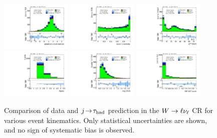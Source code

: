 \begin{figure}[!htpb]
  \includegraphics[width=0.30\textwidth]{figures/analysis/vbf-WlvCR/jets-etaprod}
  \includegraphics[width=0.30\textwidth]{figures/analysis/vbf-WlvCR/lep-eta-centrality}
  \includegraphics[width=0.30\textwidth]{figures/analysis/vbf-WlvCR/system-pt} \\
  \includegraphics[width=0.30\textwidth]{figures/analysis/vbf-WlvCR/n-jets30}
  \includegraphics[width=0.30\textwidth]{figures/analysis/vbf-WlvCR/dijet-m-veryhigh}
  \includegraphics[width=0.30\textwidth]{figures/analysis/vbf-WlvCR/BDTEve-VBF} \\
  \caption{Comparison of data and $j\!\rightarrow\!\tau_\text{had}$ prediction in the $W \rightarrow \ell\nu_\ell$ CR for various event kinematics. Only statistical uncertainties are shown, and no sign of systematic bias is observed.}
  \label{fig:backgrounds-WlvCR-jets}
\end{figure}


